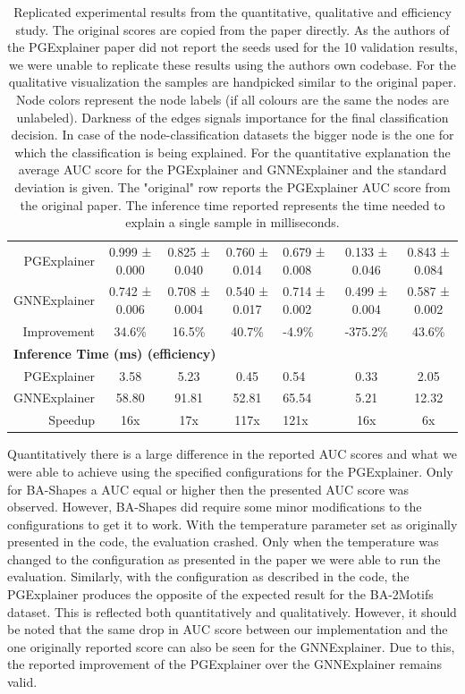 \begin{table}[h!]
{\begin{tabular}{rcccccc}
PGExplainer & 0.999 ± 0.000 & 0.825 ± 0.040 & 0.760 ± 0.014 & \multicolumn{1}{l|}{0.679 ± 0.008} & 0.133 ± 0.046 & 0.843 ± 0.084 \\ 
GNNExplainer & 0.742 ± 0.006 & 0.708 ± 0.004 & 0.540 ± 0.017 & \multicolumn{1}{l|}{0.714 ± 0.002} & 0.499 ± 0.004 & 0.587 ± 0.002 \\ 
Improvement & 34.6\% & 16.5\% & 40.7\% & \multicolumn{1}{l|}{-4.9\%} & -375.2\% & 43.6\% \\ \hline
\multicolumn{7}{l}{\textbf{Inference Time (ms) (efficiency)}} \\ \hline
PGExplainer & 3.58 & 5.23 & 0.45 & \multicolumn{1}{l|}{0.54} & 0.33 & 2.05 \\
GNNExplainer & 58.80 & 91.81 & 52.81 & \multicolumn{1}{l|}{65.54} & 5.21 & 12.32 \\
Speedup & 16x & 17x & 117x & \multicolumn{1}{l|}{121x} & 16x & 6x \\
\bottomrule
\end{tabular}}
\caption{Replicated experimental results from the quantitative, qualitative and efficiency study. The original scores are copied from the paper directly. As the authors of the PGExplainer paper did not report the seeds used for the 10 validation results, we were unable to replicate these results using the authors own codebase. For the qualitative visualization the samples are handpicked similar to the original paper. Node colors represent the node labels (if all colours are the same the nodes are unlabeled). Darkness of the edges signals importance for the final classification decision. In case of the node-classification datasets the bigger node is the one for which the classification is being explained. For the quantitative explanation the average AUC score for the PGExplainer and GNNExplainer and the standard deviation is given. The "original" row reports the PGExplainer AUC score from the original paper. The inference time reported represents the time needed to explain a single sample in milliseconds.}
\label{tab:reproduction_results2}
\end{table}

Quantitatively there is a large difference in the reported AUC scores and what we were able to achieve using the specified configurations for the PGExplainer. Only for BA-Shapes a AUC equal or higher then the presented AUC score was observed. However, BA-Shapes did require some minor modifications to the configurations to get it to work. With the temperature parameter set as originally presented in the code, the evaluation crashed. Only when the temperature was changed to the configuration as presented in the paper we were able to run the evaluation. Similarly, with the configuration as described in the code, the PGExplainer produces the opposite of the expected result for the BA-2Motifs dataset. This is reflected both quantitatively and qualitatively. However, it should be noted that the same drop in AUC score between our implementation and the one originally reported score can also be seen for the GNNExplainer. Due to this, the reported improvement of the PGExplainer over the GNNExplainer remains valid. 


